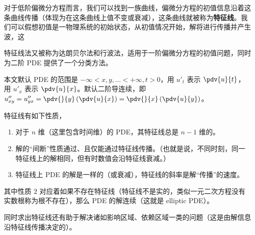 
\begin{issues}
\issueTODO
{}
\end{issues}


对于低阶偏微分方程而言，我们可以找到一族曲线，偏微分方程的初值信息沿着这条曲线传播（体现为在这条曲线上值不变或衰减），这条曲线就被称为\textbf{特征线}。我们可以假想初值是一物理系统的初始状态，从初值情况开始，解将进行传播并产生波，这

特征线法又被称为达朗贝尔法和行波法，适用于一阶偏微分方程的初值问题，同时为二阶 PDE 提供了一个分类方法。

本文默认 PDE 的范围是 $-\infty < x, y, \dots < +\infty, t>0$，用 $u'_t$ 表示 $\pdv{u}{t}$，用 $u'_x$ 表示 $\pdv{u}{x}$。默认二阶导连续，即 $u''_{xy} = u''_{yx} = \pdv{}{y}\left(\pdv{u}{x}\right) = \pdv{}{x}\left(\pdv{u}{y}\right)$。

特征线有如下性质，
\begin{enumerate}
\item 对于 $n$ 维（这里包含时间维）的 PDE，其特征线总是 $n-1$ 维的。
\item 解的“间断”性质通过、且仅能通过特征线传播。（也就是说，不同时刻，同一特征线上的解相同，但有时数值会沿特征线衰减。）
\item 特征线上 PDE 的解是一样的（或衰减），特征线的斜率是解“传播”的速度。
\end{enumerate}
其中性质 $2$ 对应着如果不存在特征线（特征线不是实的，类似一元二次方程没有实数根称为根不存在），那么 PDE 的解连续（这就是 elliptic PDE）。

同时求出特征线还有助于解决诸如影响区域、依赖区域一类的问题（这是由解信息沿特征线传播决定的）。







